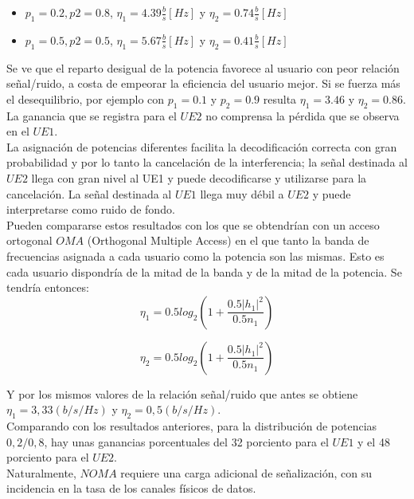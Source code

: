 \documentclass[]{article}
\begin{document}
\begin{itemize}
	\item $p_1=0.2,p2=0.8$, $\eta_1=4.39\frac{b}{s}[Hz]$ y $\eta_2=0.74\frac{b}{s}[Hz]$
		\item $p_1=0.5,p2=0.5$, $\eta_1=5.67\frac{b}{s}[Hz]$ y $\eta_2=0.41\frac{b}{s}[Hz]$
\end{itemize} 

Se ve que el reparto desigual de la potencia favorece al usuario con peor relación señal/ruido, a costa de empeorar la eficiencia del usuario mejor. Si se fuerza más el desequilibrio, por ejemplo con $p_1=0.1$ y $p_2=0.9$ resulta $\eta_1=3.46$ y $\eta_2=0.86$. La ganancia que se registra para el $UE2$ no comprensa la pérdida que se observa en el $UE1$.\\
 
La asignación de potencias diferentes facilita la decodificación correcta con gran probabilidad y por lo tanto la cancelación de la interferencia; la señal destinada al $UE2$ llega con gran nivel al UE1 y puede decodificarse y utilizarse para la cancelación. La señal destinada al $UE1$ llega muy débil a $UE2$ y puede interpretarse como ruido de fondo.\\

Pueden compararse estos resultados con los que se obtendrían con un acceso ortogonal $OMA$ (Orthogonal Multiple Access) en el que tanto la banda de frecuencias asignada a cada usuario como la potencia son las mismas. Esto es cada usuario dispondría de la mitad de la banda y de la mitad de la potencia. Se tendría entonces:\\

\begin{equation}
  \eta_1=0.5log_2(1+\frac{0.5|h_1|^ 2}{0.5n_1})
\end{equation}


\begin{equation}
\eta_2=0.5log_2(1+\frac{0.5|h_1|^ 2}{0.5n_1})
\end{equation}

Y por los mismos valores de la relación señal/ruido que antes se obtiene $\eta_1=3,33 (b/s/Hz)$ y $\eta_2=0,5 (b/s/Hz)$.\\
 
Comparando con los resultados anteriores, para la distribución de potencias $0,2/0,8$, hay unas ganancias porcentuales del 32 porciento para el $UE1$ y el 48 porciento para el $UE2$.\\
 
Naturalmente, $NOMA$ requiere una carga adicional de señalización, con su incidencia en la tasa de los canales físicos de datos.\\
\end{document}
